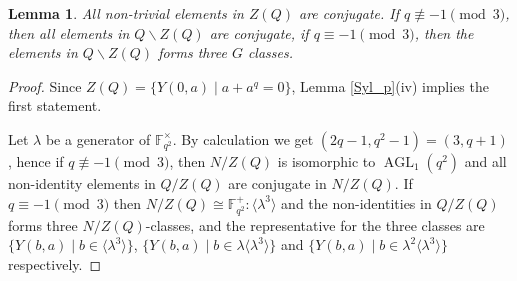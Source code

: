 \documentclass[12pt,reqno]{amsart}
\newcommand{\AGL}{\operatorname{AGL}}
\newcommand{\FF}{\mathbb{F}}
\newcommand{\lr}{\langle}
\newcommand{\rr}{\rangle}
\theoremstyle{plain}
\newtheorem{lemma}[proposition]{Lemma}
\theoremstyle{definition}
\begin{document}
\begin{lemma}
	All non-trivial elements in $Z(Q)$ are conjugate. If $q\nequiv -1 \pmod 3$, then all elements in $Q\backslash Z(Q)$ are conjugate, if $q\equiv -1 \pmod 3$, then the elements in $Q\backslash Z(Q)$ forms three $G$ classes.
\end{lemma}
\begin{proof}
	Since $Z(Q)=\{Y(0,a)\mid a+a^q=0 \}$, Lemma \ref{Syl_p}(iv) implies the first statement.
	
	Let $\lambda $ be a generator of $\FF_{q^2}^{\times}$.
	By calculation we get $(2q-1,q^2-1)=(3,q+1)$, hence if $q\nequiv -1 \pmod 3$, then $N/Z(Q)$ is isomorphic to $\AGL_1(q^2)$ and all non-identity elements in $Q/Z(Q)$ are conjugate in $N/Z(Q)$.
	If $q \equiv -1 \pmod 3$ then $N/Z(Q)\cong \FF_{q^2}^{+}{:}\lr \lambda^3\rr $ and the non-identities in $Q/Z(Q)$ forms three $N/Z(Q) $-classes, and the representative for the three classes are $\{Y(b,a)\mid b\in \lr\lambda^3\rr  \}$, $\{Y(b,a)\mid b\in \lambda\lr \lambda^3\rr  \}$ and $\{Y(b,a)\mid b\in \lambda^2\lr \lambda^3\rr  \}$ respectively.
\end{proof}
\end{document}
